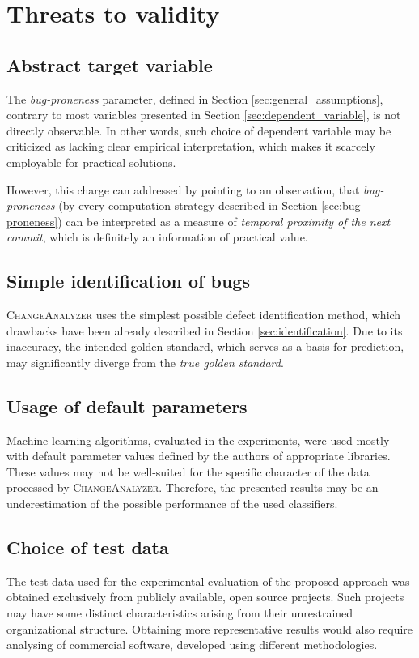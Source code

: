 \documentclass{pracamgr}
\newcommand{\ca}{\textsc{ChangeAnalyzer}\xspace}
\begin{document}
\section{Threats to validity}
\label{sec:threats}

\subsection{Abstract target variable}
\label{sec:abstract_variable}
The \emph{bug-proneness} parameter, defined in Section \ref{sec:general_assumptions}, contrary to most variables presented in Section \ref{sec:dependent_variable}, is not directly observable. In other words, such choice of dependent variable may be criticized as lacking clear empirical interpretation, which makes it scarcely employable for practical solutions.

However, this charge can addressed by pointing to an observation, that \emph{bug-proneness} (by every computation strategy described in Section \ref{sec:bug-proneness}) can be interpreted as a measure of \emph{temporal proximity of the next commit}, which is definitely an information of practical value.

\subsection{Simple identification of bugs}
\label{sec:simple_identification}
\ca uses the simplest possible defect identification method, which drawbacks have been already described in Section \ref{sec:identification}. Due to its inaccuracy, the intended golden standard, which serves as a basis for prediction, may significantly diverge from the \emph{true golden standard}.

\subsection{Usage of default parameters}
\label{sec:default_parameters}
Machine learning algorithms, evaluated in the experiments, were used mostly with default parameter values defined by the authors of appropriate libraries. These values may not be well-suited for the specific character of the data processed by \ca. Therefore, the presented results may be an underestimation of the possible performance of the used classifiers.

\subsection{Choice of test data}
\label{sech:choice_of_data}
The test data used for the experimental evaluation of the proposed approach was obtained exclusively from publicly available, open source projects. Such projects may have some distinct characteristics arising from their unrestrained organizational structure. Obtaining more representative results would also require analysing of commercial software, developed using different methodologies.
\end{document}
